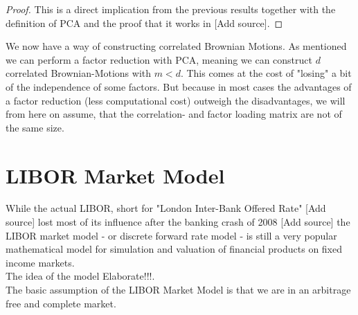 \documentclass[12pt]{article}
\begin{document}
	\begin{proof}
		This is a direct implication from the previous results together with the definition of PCA and the proof that it works in \color{red}[Add source]\color{black}. %
	\end{proof}
	We now have a way of constructing correlated Brownian Motions. As mentioned we can perform a factor reduction with PCA, meaning we can construct $d$ correlated Brownian-Motions with $m < d$. This comes at the cost of "losing" a bit of the independence of some factors. But because in most cases the advantages of a factor reduction (less computational cost) outweigh the disadvantages, we will from here on assume, that the correlation- and factor loading matrix are not of the same size.
	
	
	
	
	\pagebreak
	\section{LIBOR Market Model}\label{sec::LIBORModel}
	
	While the actual LIBOR, short for "London Inter-Bank Offered Rate" \color{red}[Add source] \color{black} %
	lost most of its influence after the banking crash of 2008 \color{red}[Add source] \color{black} %
	the LIBOR market model - or discrete forward rate model - is still a very popular mathematical model for simulation and valuation of financial products on fixed income markets.\\
	The idea of the model  \color{red}Elaborate!!!\color{black}. 
	\\
	The basic assumption of the LIBOR Market Model is that we are in an arbitrage free and complete market.
	
\end{document}
